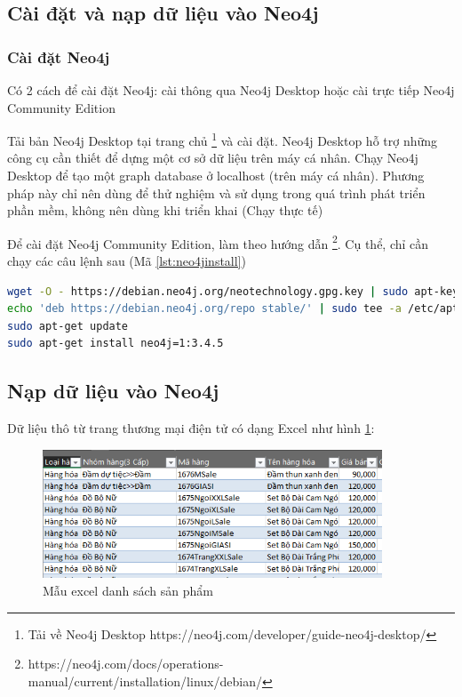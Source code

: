 \subsection{Cài đặt và nạp dữ liệu vào Neo4j}
\subsubsection{Cài đặt Neo4j} \label{sec:installneo4jinstance}

Có 2 cách để cài đặt Neo4j: cài thông qua Neo4j Desktop hoặc cài trực tiếp Neo4j Community Edition

Tải bản Neo4j Desktop tại trang chủ \footnote{Tải về Neo4j Desktop https://neo4j.com/developer/guide-neo4j-desktop/} và cài đặt. Neo4j Desktop hỗ trợ những công cụ cần thiết để dựng một cơ sở dữ liệu trên máy cá nhân. Chạy Neo4j Desktop để tạo một graph database ở localhost (trên máy cá nhân). Phương pháp này chỉ nên dùng để thử nghiệm và sử dụng trong quá trình phát triển phần mềm, không nên dùng khi triển khai (Chạy thực tế)

Để cài đặt Neo4j Community Edition, làm theo hướng dẫn \footnote{https://neo4j.com/docs/operations-manual/current/installation/linux/debian/}. Cụ thể, chỉ cần chạy các câu lệnh sau (Mã \ref{lst:neo4jinstall})

\begin{lstlisting}[basicstyle=\tiny,language=bash,caption={Cài Neo4j},label={lst:neo4jinstall}]
wget -O - https://debian.neo4j.org/neotechnology.gpg.key | sudo apt-key add -
echo 'deb https://debian.neo4j.org/repo stable/' | sudo tee -a /etc/apt/sources.list.d/neo4j.list
sudo apt-get update
sudo apt-get install neo4j=1:3.4.5
\end{lstlisting}

\subsection{Nạp dữ liệu vào Neo4j}\label{sec:csdlncutil}

Dữ liệu thô từ trang thương mại điện tử có dạng Excel như hình \ref{fig:excelsample}:  

\begin{figure}[H]
\centering
\includegraphics[width=0.9\textwidth]{imagev2/danhsachsanpham.PNG}
\caption{\label{fig:excelsample} Mẫu excel danh sách sản phẩm}
\end{figure}

